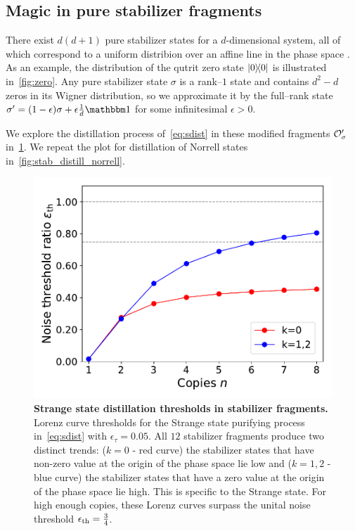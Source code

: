 \documentclass[pra,
aps,
twocolumn,
superscriptaddress,
groupedaddress,
nofootinbib,
reprint
]{revtex4-1}
\begin{document}
\newpage

\subsection{Magic in pure stabilizer fragments}\label{sec:magstab}

There exist $d(d+1)$ pure stabilizer states for a $d$-dimensional system, all of which correspond to a uniform distribion over an affine line in the phase space .
As an example, the distribution of the qutrit zero state $\ketbra{0}$ is illustrated in~\cref{fig:zero}.
Any pure stabilizer state $\sigma$ is a rank--$1$ state and contains $d^2 - d$ zeros in its Wigner distribution, so we approximate it by the full--rank state $\sigma' = (1-\epsilon)\sigma + \epsilon \frac{1}{d}\id$ for some infinitesimal $\epsilon > 0$.

We explore the distillation process of~\cref{eq:sdist} in these modified fragments $\mathcal{O}_\sigma'$ in~\cref{fig:stab_distill}.
We repeat the plot for distillation of Norrell states in~\cref{fig:stab_distill_norrell}.


\begin{figure}
    \centering
    \includegraphics[scale=0.5]{figs/stab_distill.pdf}
    \caption{\textbf{Strange state distillation thresholds in stabilizer fragments.} Lorenz curve thresholds for the Strange state purifying process in~\cref{eq:sdist} with $\epsilon_\tau = 0.05$.
    All $12$ stabilizer fragments produce two distinct trends: ($k=0$ - red curve) the stabilizer states that have non-zero value at the origin of the phase space lie low and ($k=1,2$ - blue curve) the stabilizer states that have a zero value at the origin of the phase space lie high.
    This is specific to the Strange state.
    For high enough copies, these Lorenz curves surpass the unital noise threshold $\epsilon_{\rm{th}} = \frac{3}{4}$.
    }
    \label{fig:stab_distill}
\end{figure}
\end{document}
